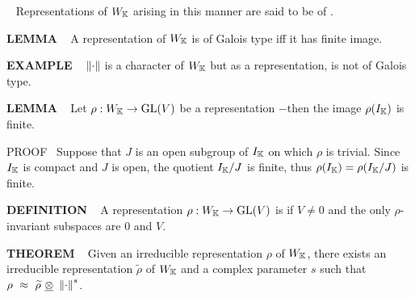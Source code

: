 \begin{x}{\small\bf {}} \ %
Representations of $W_{\mathbb{K}}$ arising in this manner are said to be of .
\end{x}

\vspace{0.1cm}

\begin{x}{\small\bf LEMMA} \ %
A representation of $W_{\mathbb{K}}$ is of Galois type iff it has finite image.
\end{x}

\vspace{0.1cm}

\begin{x}{\small\bf EXAMPLE} \ %
$\left\lVert \cdot \right\rVert$ is a character of $W_{\mathbb{K}}$ but as a representation, is not of Galois type.
\end{x}

\vspace{0.1cm}

\begin{x}{\small\bf LEMMA} \ %
Let $\rho:W_{\mathbb{K}} \rightarrow \text{GL}(V)$ be a representation $-$then the image $\rho(I_{\mathbb{K}})$ is finite.

\vspace{0.1cm}

PROOF \ 
Suppose that $J$ is an open subgroup of $I_{\mathbb{K}}$ on which $\rho$ is trivial.  
Since $I_{\mathbb{K}}$ is compact and $J$ is open, the quotient $I_{\mathbb{K}} / J$ is finite, thus 
$\rho(I_{\mathbb{K}}) = \rho(I_{\mathbb{K}} / J)$ is finite.
\end{x}

\vspace{0.1cm}

\begin{x}{\small\bf DEFINITION} \ %
A representation $\rho:W_{\mathbb{K}} \rightarrow \text{GL}(V)$ is  if $V \neq 0$ 
and the only $\rho$-invariant subspaces are 0 and $V$.
\end{x}

\vspace{0.1cm}

\begin{x}{\small\bf THEOREM} \ %
Given an irreducible representation $\rho$ of $W_{\mathbb{K}}$, there exists an irreducible representation $\widetilde{\rho}$ of $W_{\mathbb{K}}$ 
and a complex parameter $s$ such that $\rho \ \approx \ \widetilde{\rho} \ \un{\otimes} \ \norm{\cdot}^s$.
\end{x}

